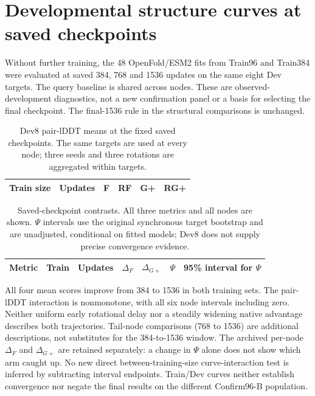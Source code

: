 \clearpage
\section{Developmental structure curves at saved checkpoints}
\label{app:checkpoint_curves}
Without further training, the 48 OpenFold/ESM2 fits from Train96 and Train384
were evaluated at saved 384, 768 and 1536 updates on the same eight Dev targets.
The query baseline is shared across nodes. These are observed-development
diagnostics, not a new confirmation panel or a basis for selecting the final
checkpoint.
The final-1536 rule in the structural comparisons is unchanged.

\begin{table}[htbp]\centering\small
\caption{Dev8 pair-lDDT means at the fixed saved checkpoints. The same targets
are used at every node; three seeds and three rotations are aggregated within targets.}
\begin{tabular}{llrrrr}\toprule
Train size & Updates & F & RF & G+ & RG+ \\\midrule

\end{tabular}\end{table}

\begin{table}[htbp]\centering\footnotesize
\caption{Saved-checkpoint contrasts. All three metrics and all nodes are
shown. $\Psi$ intervals use the original synchronous target bootstrap and are
unadjusted, conditional on fitted models; Dev8 does not supply precise convergence evidence.}
\begin{tabular}{lllrrrr}\toprule
Metric & Train & Updates & $\Delta_F$ & $\Delta_{G+}$ & $\Psi$ & 95\% interval for $\Psi$ \\\midrule

\end{tabular}\end{table}

All four mean scores improve from 384 to 1536 in both training sets.
The pair-lDDT interaction is nonmonotone, with all six node intervals including
zero. Neither uniform early rotational delay nor a steadily widening native
advantage describes both trajectories. Tail-node comparisons (768 to 1536)
are additional descriptions, not substitutes for the 384-to-1536 window.
The archived per-node $\Delta_F$ and $\Delta_{G+}$ are retained separately:
a change in $\Psi$ alone does not show which arm caught up. No new direct
between-training-size curve-interaction test is inferred by subtracting
interval endpoints. Train/Dev curves neither establish convergence nor negate
the final results on the different Confirm96-B population.

